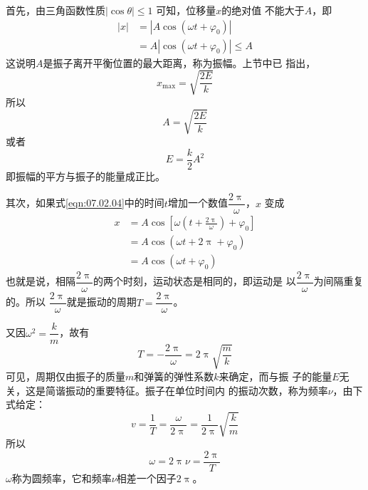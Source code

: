 首先，由三角函数性质$  \left| \cos \theta \right| \leqslant 1  $ 可知，位移量$ x $的绝对值
不能大于$ A $，即
\begin{equation*}
  \begin{aligned}
    \left| x \right| & = \left| A \cos \left( \omega t + \varphi _ { 0 } \right) \right|             \\
                     & = A \left| \cos \left( \omega t + \varphi _ { 0 } \right) \right| \leqslant A
  \end{aligned}
\end{equation*}
这说明$ A $是振子离开平衡位置的最大距离，称为振幅。上节中已
指出，
\begin{equation*}
  x _ { \max } = \sqrt { \frac { 2 E } { k } }
\end{equation*}
所以%
\begin{equation*}
  A = \sqrt { \frac { 2 E } { k } }
\end{equation*}
或者%
\begin{equation}\label{eqn:07.02.05}
  E = \frac { k } { 2 } A ^ { 2 }
\end{equation}
即振幅的平方与振子的能量成正比。

其次，如果式\eqref{eqn:07.02.04}中的时间$ t $增加一个数值$ \dfrac { 2 \uppi } { \omega } $，$ x $
变成
\begin{equation*}
  \begin{aligned}
    x & = A \cos \left[ \omega \left( t + \frac { 2 \uppi } { \omega } \right) + \varphi _ { 0 } \right] \\
      & = A \cos \left( \omega t + 2 \uppi + \varphi _ { 0 } \right)                                     \\
      & = A \cos \left( \omega t + \varphi _ { 0 } \right)
  \end{aligned}
\end{equation*}
也就是说，相隔$ \dfrac { 2 \uppi } { \omega } $的两个时刻，运动状态是相同的，即运动是
以$ \dfrac { 2 \uppi } { \omega } $为间隔重复的。所以 $ \dfrac { 2 \uppi } { \omega } $就是振动的周期$ T = \dfrac { 2 \uppi } { \omega } $。

又因$ \omega ^ { 2 } = \dfrac { k } { m } $，故有
\begin{equation}\label{eqn:07.02.06}
  T = - \frac { 2 \uppi } { \omega } = 2 \uppi \sqrt { \frac { m } { k } }
\end{equation}
可见，周期仅由振子的质量$ m $和弹簧的弹性系数$ k $来确定，而与振
子的能量$ E $无关，这是简谐振动的重要特征。振子在单位时间内
的振动次数，称为频率$ \nu $，由下式给定：
\begin{equation*}
  v = \frac { 1 } { T } = \frac { \omega } { 2 \uppi } = \frac { 1 } { 2 \uppi } \sqrt { \frac { k } { m } }
\end{equation*}
所以
\begin{equation*}
  \omega = 2 \uppi \nu = \frac { 2 \uppi } { T }
\end{equation*}
$ \omega $称为圆频率，它和频率$ \nu $相差一个因子$ 2 \uppi $。

